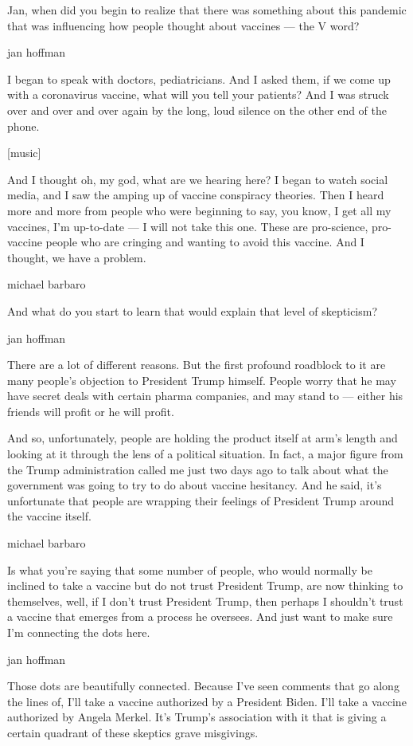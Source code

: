 Jan, when did you begin to realize that there was something about this
pandemic that was influencing how people thought about vaccines --- the
V word?

jan hoffman

I began to speak with doctors, pediatricians. And I asked them, if we
come up with a coronavirus vaccine, what will you tell your patients?
And I was struck over and over and over again by the long, loud silence
on the other end of the phone.

{[}music{]}

And I thought oh, my god, what are we hearing here? I began to watch
social media, and I saw the amping up of vaccine conspiracy theories.
Then I heard more and more from people who were beginning to say, you
know, I get all my vaccines, I'm up-to-date --- I will not take this
one. These are pro-science, pro-vaccine people who are cringing and
wanting to avoid this vaccine. And I thought, we have a problem.

michael barbaro

And what do you start to learn that would explain that level of
skepticism?

jan hoffman

There are a lot of different reasons. But the first profound roadblock
to it are many people's objection to President Trump himself. People
worry that he may have secret deals with certain pharma companies, and
may stand to --- either his friends will profit or he will profit.

And so, unfortunately, people are holding the product itself at arm's
length and looking at it through the lens of a political situation. In
fact, a major figure from the Trump administration called me just two
days ago to talk about what the government was going to try to do about
vaccine hesitancy. And he said, it's unfortunate that people are
wrapping their feelings of President Trump around the vaccine itself.

michael barbaro

Is what you're saying that some number of people, who would normally be
inclined to take a vaccine but do not trust President Trump, are now
thinking to themselves, well, if I don't trust President Trump, then
perhaps I shouldn't trust a vaccine that emerges from a process he
oversees. And just want to make sure I'm connecting the dots here.

jan hoffman

Those dots are beautifully connected. Because I've seen comments that go
along the lines of, I'll take a vaccine authorized by a President Biden.
I'll take a vaccine authorized by Angela Merkel. It's Trump's
association with it that is giving a certain quadrant of these skeptics
grave misgivings.

